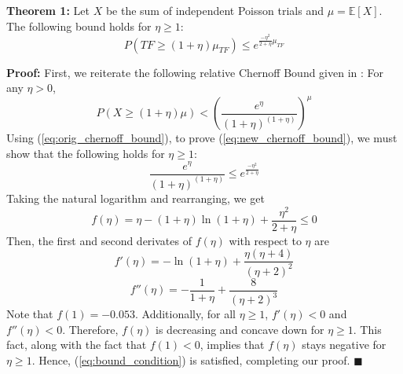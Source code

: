 \noindent
{\bf Theorem 1:}
Let $X$ be the sum of independent Poisson trials and $\mu = \mathbb{E}[X]$.  The following bound holds for $\eta \geq 1$:
\begin{equation}
\label{eq:new_chernoff_bound}
	P( TF \geq (1 + \eta)\mu_{TF} ) \leq e^{\frac{-\eta^2}{2+\eta}\mu_{TF}}
\end{equation}

\noindent
{\bf Proof:}
First, we reiterate the following relative Chernoff Bound given in \cite{mitzenmacher2005probability}:  
For any $\eta > 0$, 
\begin{equation}
\label{eq:orig_chernoff_bound}
	P( X \geq (1 + \eta) \mu ) < ( \frac{e^\eta}{(1+\eta)^{(1+\eta)}} )^\mu
\end{equation}
Using (\ref{eq:orig_chernoff_bound}), to prove (\ref{eq:new_chernoff_bound}), we must show that the following holds for $\eta \geq 1$:
\begin{equation}
\label{eq:bound_condition}
	\frac{e^\eta}{(1+\eta)^{(1+\eta)}} \leq e^{\frac{-\eta^2}{2+\eta}}
\end{equation}
Taking the natural logarithm and rearranging, we get
\begin{equation}
	f( \eta ) = \eta - (1+\eta)\ln(1+\eta) + \frac{\eta^2}{2+\eta} \leq 0
\end{equation}
Then, the first and second derivates of $f(\eta)$ with respect to $\eta$ are
\begin{equation}
	f'( \eta ) = -\ln(1+\eta) + \frac{\eta(\eta + 4)}{(\eta+2)^2}
\end{equation}
\begin{equation}
	f''( \eta ) = -\frac{1}{1+\eta} + \frac{8}{(\eta+2)^3}
\end{equation}
Note that $f(1) = -0.053$.  Additionally, for all $\eta \geq 1$, $f'(\eta) < 0$ and $f''(\eta) < 0$.  Therefore, $f(\eta)$ is decreasing and concave down for $\eta \geq 1$.  This fact, along with the fact that $f(1) < 0$, implies that $f(\eta)$ stays negative for $\eta \geq 1$.  Hence, (\ref{eq:bound_condition}) is satisfied, completing our proof.
\hfill$\blacksquare$


